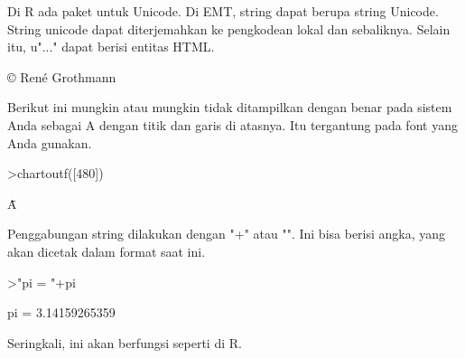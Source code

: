 \documentclass[a4paper,10pt]{article}
\begin{document}
\begin{eulernotebook}
\begin{eulercomment}
\begin{eulercomment}
\begin{eulercomment}
\begin{eulercomment}
\begin{eulercomment}
\begin{eulercomment}
\begin{eulercomment}
Di R ada paket untuk Unicode. Di EMT, string dapat berupa string
Unicode. String unicode dapat diterjemahkan ke pengkodean lokal dan
sebaliknya. Selain itu, u"..." dapat berisi entitas HTML.
\end{eulercomment}
\begin{euleroutput}
  © René Grothmann
\end{euleroutput}
\begin{eulercomment}
Berikut ini mungkin atau mungkin tidak ditampilkan dengan benar pada
sistem Anda sebagai A dengan titik dan garis di atasnya. Itu
tergantung pada font yang Anda gunakan.
\end{eulercomment}
\begin{eulerprompt}
>chartoutf([480])
\end{eulerprompt}
\begin{euleroutput}
  Ǡ
\end{euleroutput}
\begin{eulercomment}
Penggabungan string dilakukan dengan "+" atau "\textbar{}". Ini bisa berisi
angka, yang akan dicetak dalam format saat ini.
\end{eulercomment}
\begin{eulerprompt}
>"pi = "+pi
\end{eulerprompt}
\begin{euleroutput}
  pi = 3.14159265359
\end{euleroutput}
\begin{eulercomment}
Seringkali, ini akan berfungsi seperti di R.


\end{eulercomment}
\end{eulercomment}
\end{eulercomment}
\end{eulercomment}
\end{eulercomment}
\end{eulercomment}
\end{eulercomment}
\end{eulernotebook}
\end{document}
